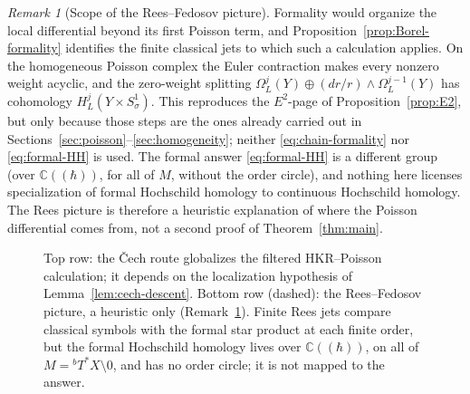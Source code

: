 \documentclass[11pt,oneside,reqno]{article}
\newcommand{\C}{\mathbb C}
\newcommand{\cA}{\mathcal A}
\newcommand{\Tbstar}{{}^{b}T^*X}
\theoremstyle{plain}
\theoremstyle{definition}
\theoremstyle{remark}
\newtheorem{remark}[theorem]{Remark}
\begin{document}
\begin{remark}[Scope of the Rees--Fedosov picture]\label{rem:rees-scope}
Formality would organize the local differential beyond its first Poisson
term, and Proposition~\ref{prop:Borel-formality} identifies the finite
classical jets to which such a calculation applies. On the homogeneous
Poisson complex the Euler contraction makes every nonzero weight acyclic,
and the zero-weight splitting
\(\Omega_L^j(Y)\oplus(dr/r)\wedge\Omega_L^{j-1}(Y)\) has cohomology
\(H_L^j(Y\times S^1_\sigma)\). This reproduces the \(E^2\)-page of
Proposition~\ref{prop:E2}, but only because those steps are the ones
already carried out in Sections~\ref{sec:poisson}--\ref{sec:homogeneity};
neither \eqref{eq:chain-formality} nor \eqref{eq:formal-HH} is used. The
formal answer \eqref{eq:formal-HH} is a different group (over
\(\C((\hbar))\), for all of \(M\), without the order circle), and nothing
here licenses specialization of formal Hochschild homology to continuous
Hochschild homology. The Rees picture is therefore a heuristic explanation
of where the Poisson differential comes from, not a second proof of
Theorem~\ref{thm:main}.
\end{remark}

\begin{figure}[htbp]
\centering
{}
\caption[Two alternative organizations of the calculation]{Top row: the
\v Cech route globalizes the filtered HKR--Poisson calculation; it depends
on the localization hypothesis of Lemma~\ref{lem:cech-descent}. Bottom row (dashed): the Rees--Fedosov picture, a
heuristic only (Remark~\ref{rem:rees-scope}). Finite Rees jets compare
classical symbols with the formal star product at each finite order, but
the formal Hochschild homology lives over \(\C((\hbar))\), on all of
\(M=\Tbstar\setminus0\), and has no order circle; it is not mapped to the
answer.}
\end{figure}
\end{document}
